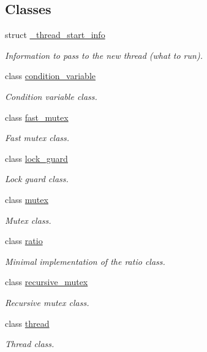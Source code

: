 \subsection*{Classes}
\begin{DoxyCompactItemize}
\item 
struct \hyperlink{structtthread_1_1__thread__start__info}{\+\_\+thread\+\_\+start\+\_\+info}
\begin{DoxyCompactList}\small\item\em Information to pass to the new thread (what to run). \end{DoxyCompactList}\item 
class \hyperlink{classtthread_1_1condition__variable}{condition\+\_\+variable}
\begin{DoxyCompactList}\small\item\em Condition variable class. \end{DoxyCompactList}\item 
class \hyperlink{classtthread_1_1fast__mutex}{fast\+\_\+mutex}
\begin{DoxyCompactList}\small\item\em Fast mutex class. \end{DoxyCompactList}\item 
class \hyperlink{classtthread_1_1lock__guard}{lock\+\_\+guard}
\begin{DoxyCompactList}\small\item\em Lock guard class. \end{DoxyCompactList}\item 
class \hyperlink{classtthread_1_1mutex}{mutex}
\begin{DoxyCompactList}\small\item\em Mutex class. \end{DoxyCompactList}\item 
class \hyperlink{classtthread_1_1ratio}{ratio}
\begin{DoxyCompactList}\small\item\em Minimal implementation of the {\ttfamily ratio} class. \end{DoxyCompactList}\item 
class \hyperlink{classtthread_1_1recursive__mutex}{recursive\+\_\+mutex}
\begin{DoxyCompactList}\small\item\em Recursive mutex class. \end{DoxyCompactList}\item 
class \hyperlink{classtthread_1_1thread}{thread}
\begin{DoxyCompactList}\small\item\em Thread class. \end{DoxyCompactList}\end{DoxyCompactItemize}
